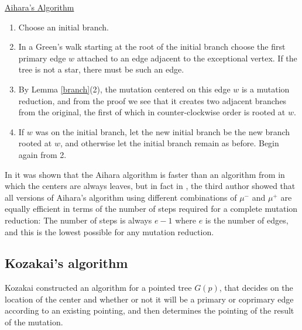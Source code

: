 \documentclass[11pt,english]{article}
\numberwithin{figure}{section}
\numberwithin{equation}{section}
\numberwithin{table}{section}
\theoremstyle{definition}
\theoremstyle{remark}
\begin{document}
\noindent \uline{Aihara's Algorithm}\cite{Ai} 
\begin{enumerate}
	\item Choose an initial branch.  
	
	\item In a Green's walk starting at the root of the initial branch choose the first primary edge
	$w$ attached to  an edge adjacent to the exceptional vertex.  If the tree is not a star, there must
	be such an edge. 
	
	\item By Lemma \ref{branch}(2), the mutation centered on this edge $w$ is a mutation
	reduction, and from the proof we see that it creates two adjacent branches from the original,
	the first of which in counter-clockwise order is rooted at $w$.
	
	\item If $w$ was on the initial branch, let the new initial branch be the new branch rooted at $w$, and otherwise
	let the initial branch remain as before.  Begin again from 2.
	
\end{enumerate}

In \cite{SZv} it was shown that the Aihara algorithm is faster than an algorithm from \cite{Z} in which the centers are always leaves, but in fact in \cite{Z2}, the third author showed that all versions of Aihara's algorithm using different combinations of $\mu^-$ and $\mu^+$ are equally efficient in terms of the number of steps required for a complete mutation reduction:  The number of steps is always $e-1$ where $e$ is the number of edges, and this is the lowest possible for any mutation reduction.



\subsection{Kozakai's algorithm}

Kozakai constructed an algorithm for a pointed tree $G(p)$, that decides on the location of the center and whether or not it will be a primary or coprimary edge according to an existing pointing, and then determines the pointing of the result of the mutation. 
\end{document}
